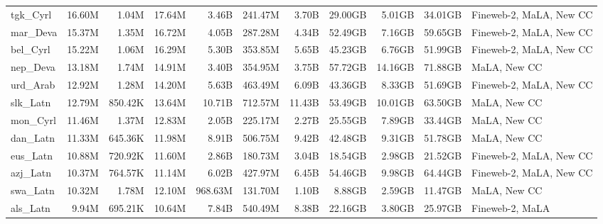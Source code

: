 \begin{table*}[!htp]
{\begin{tabular}{l|rrr|rrr|rrr|l}
tgk\_Cyrl                   & 16.60M     & 1.04M        & 17.64M      & 3.46B        & 241.47M        & 3.70B         & 29.00GB    & 5.01GB       & 34.01GB     & Fineweb-2, MaLA, New CC \\
mar\_Deva                   & 15.37M     & 1.35M        & 16.72M      & 4.05B        & 287.28M        & 4.34B         & 52.49GB    & 7.16GB       & 59.65GB     & Fineweb-2, MaLA, New CC \\
bel\_Cyrl                   & 15.22M     & 1.06M        & 16.29M      & 5.30B        & 353.85M        & 5.65B         & 45.23GB    & 6.76GB       & 51.99GB     & Fineweb-2, MaLA, New CC \\
nep\_Deva                   & 13.18M     & 1.74M        & 14.91M      & 3.40B        & 354.95M        & 3.75B         & 57.72GB    & 14.16GB      & 71.88GB     & MaLA, New CC            \\
urd\_Arab                   & 12.92M     & 1.28M        & 14.20M      & 5.63B        & 463.49M        & 6.09B         & 43.36GB    & 8.33GB       & 51.69GB     & Fineweb-2, MaLA, New CC \\
slk\_Latn                   & 12.79M     & 850.42K      & 13.64M      & 10.71B       & 712.57M        & 11.43B        & 53.49GB    & 10.01GB      & 63.50GB     & MaLA, New CC            \\
mon\_Cyrl                   & 11.46M     & 1.37M        & 12.83M      & 2.05B        & 225.17M        & 2.27B         & 25.55GB    & 7.89GB       & 33.44GB     & MaLA, New CC            \\
dan\_Latn                   & 11.33M     & 645.36K      & 11.98M      & 8.91B        & 506.75M        & 9.42B         & 42.48GB    & 9.31GB       & 51.78GB     & MaLA, New CC            \\
eus\_Latn                   & 10.88M     & 720.92K      & 11.60M      & 2.86B        & 180.73M        & 3.04B         & 18.54GB    & 2.98GB       & 21.52GB     & Fineweb-2, MaLA, New CC \\
azj\_Latn                   & 10.37M     & 764.57K      & 11.14M      & 6.02B        & 427.97M        & 6.45B         & 54.46GB    & 9.98GB       & 64.44GB     & Fineweb-2, MaLA, New CC \\
swa\_Latn                   & 10.32M     & 1.78M        & 12.10M      & 968.63M      & 131.70M        & 1.10B         & 8.88GB     & 2.59GB       & 11.47GB     & MaLA, New CC            \\
als\_Latn                   & 9.94M      & 695.21K      & 10.64M      & 7.84B        & 540.49M        & 8.38B         & 22.16GB    & 3.80GB       & 25.97GB     & Fineweb-2, MaLA         \\

\end{tabular}}
\end{table*}
